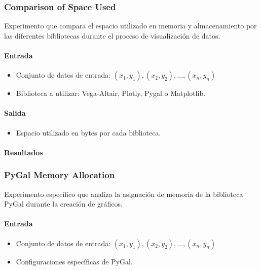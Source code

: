 \subsubsection{Comparison of Space Used}
\label{comparison_of_space_used}

Experimento que compara el espacio utilizado en memoria y almacenamiento por las diferentes bibliotecas durante el proceso de visualización de datos.

\paragraph{Entrada}
\begin{itemize}
    \item Conjunto de datos de entrada: \( (x_1, y_1), (x_2, y_2), \ldots, (x_n, y_n) \)
    \item Biblioteca a utilizar: Vega-Altair, Plotly, Pygal o Matplotlib.
\end{itemize}

\paragraph{Salida}
\begin{itemize}
    \item Espacio utilizado en bytes por cada biblioteca.
\end{itemize}

\paragraph{Resultados}
\vspace{0.5em}
\noindent

\ComparisonOfSpaceUsed
\newpage

\subsubsection{PyGal Memory Allocation}
\label{pygal_memory_allocation}

Experimento específico que analiza la asignación de memoria de la biblioteca PyGal durante la creación de gráficos.

\paragraph{Entrada}
\begin{itemize}
    \item Conjunto de datos de entrada: \( (x_1, y_1), (x_2, y_2), \ldots, (x_n, y_n) \)
    \item Configuraciones específicas de PyGal.
\end{itemize}

